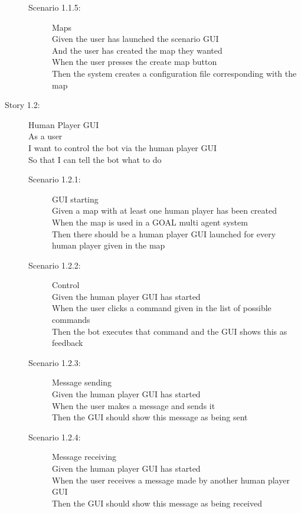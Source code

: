 \begin{description}
\begin{description}
    \item[Scenario 1.1.5:] Maps\\
    Given the user has launched the scenario GUI\\
    And the user has created the map they wanted\\
    When the user presses the create map button\\
    Then the system creates a configuration file corresponding with the map
  \end{description}
  \item[Story 1.2:] Human Player GUI\\
  As a user \\
  I want to control the bot via the human player GUI\\
  So that I can tell the bot what to do

  \begin{description}
    \item[Scenario 1.2.1:] GUI starting\\
    Given a map with at least one human player has been created\\
    When the map is used in a GOAL multi agent system\\
    Then there should be a human player GUI launched for every human player given in the map
    
    \item[Scenario 1.2.2:] Control\\
    Given the human player GUI has started\\
    When the user clicks a command given in the list of possible commands\\
    Then the bot executes that command and the GUI shows this as feedback

    \item[Scenario 1.2.3:] Message sending\\
    Given the human player GUI has started\\
    When the user makes a message and sends it\\
    Then the GUI should show this message as being sent
    
    \item[Scenario 1.2.4:] Message receiving\\
    Given the human player GUI has started\\
    When the user receives a message made by another human player GUI\\
    Then the GUI should show this message as being received


\end{description}
\end{description}
